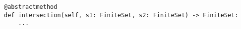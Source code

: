 \begin{verbatim}
@abstractmethod
def intersection(self, s1: FiniteSet, s2: FiniteSet) -> FiniteSet:
    ...
\end{verbatim}